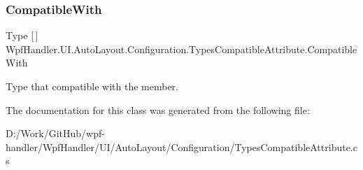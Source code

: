 \subsubsection{\texorpdfstring{Compatible\+With}{CompatibleWith}}
{\footnotesize\ttfamily Type \mbox{[}$\,$\mbox{]} Wpf\+Handler.\+U\+I.\+Auto\+Layout.\+Configuration.\+Types\+Compatible\+Attribute.\+Compatible\+With}



Type that compatible with the member. 



The documentation for this class was generated from the following file\+:\begin{DoxyCompactItemize}
\item 
D\+:/\+Work/\+Git\+Hub/wpf-\/handler/\+Wpf\+Handler/\+U\+I/\+Auto\+Layout/\+Configuration/Types\+Compatible\+Attribute.\+cs\end{DoxyCompactItemize}
